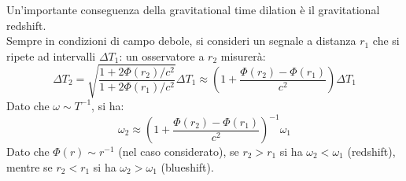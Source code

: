 Un'importante conseguenza della gravitational time dilation è il gravitational redshift.\\
Sempre in condizioni di campo debole, si consideri un segnale a distanza $ r_1 $ che si ripete ad intervalli $ \Delta T_1 $: un osservatore a $ r_2 $ misurerà:
\begin{equation}
  \Delta T_2 = \sqrt{\frac{1 + 2\Phi(r_2)/c^2}{1 + 2\Phi(r_1)/c^2}} \Delta T_1 \approx \left( 1 + \frac{\Phi(r_2) - \Phi(r_1)}{c^2} \right) \Delta T_1
  \label{eq:1.42}
\end{equation}
Dato che $ \omega \sim T^{-1} $, si ha:
\begin{equation}
  \omega_2 \approx \left( 1 + \frac{\Phi(r_2) - \Phi(r_1)}{c^2} \right)^{-1} \omega_1
  \label{eq:1.43}
\end{equation}
Dato che $ \Phi(r) \sim r^{-1} $ (nel caso considerato), se $ r_2 > r_1 $ si ha $ \omega_2 < \omega_1 $ (redshift), mentre se $ r_2 < r_1 $ si ha $ \omega_2 > \omega_1 $ (blueshift).










